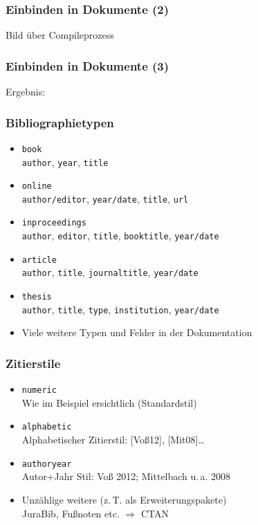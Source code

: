 \begin{frame}
  \frametitle{Einbinden in Dokumente}
  TeX}]{examples/bibliography/basic.tex}
\end{frame}

\begin{frame}
  \frametitle{Einbinden in Dokumente (2)}
  Bild über Compileprozess
\end{frame}

\begin{frame}
  \frametitle{Einbinden in Dokumente (3)}
  Ergebnis:
\end{frame}

\begin{frame}
  \frametitle{Bibliographietypen}
  \begin{itemize}
  \item \texttt{book}\\
    \texttt{author}, \texttt{year}, \texttt{title}
  \item \texttt{online}\\
    \texttt{author/editor}, \texttt{year/date}, \texttt{title},
    \texttt{url}
  \item \texttt{inproceedings}\\
    \texttt{author}, \texttt{editor}, \texttt{title},
    \texttt{booktitle}, \texttt{year/date}
  \item \texttt{article}\\
    \texttt{author}, \texttt{title}, \texttt{journaltitle},
    \texttt{year/date}
  \item \texttt{thesis}\\
    \texttt{author}, \texttt{title}, \texttt{type},
    \texttt{institution}, \texttt{year/date}
  \item Viele weitere Typen und Felder in der Dokumentation
  \end{itemize}
\end{frame}

\begin{frame}
  \frametitle{Zitierstile}
  \begin{itemize}
  \item \texttt{numeric}\\
    Wie im Beispiel ersichtlich (Standardstil)
  \item \texttt{alphabetic}\\
    Alphabetischer Zitierstil: [Voß12], [Mit08]\dots
  \item \texttt{authoryear}\\
    Autor+Jahr Stil: Voß 2012; Mittelbach u.\,a. 2008
  \item Unzählige weitere (z.\,T. als Erweiterungspakete)\\
    JuraBib, Fußnoten etc. $\Rightarrow$ CTAN
  \end{itemize}
\end{frame}

